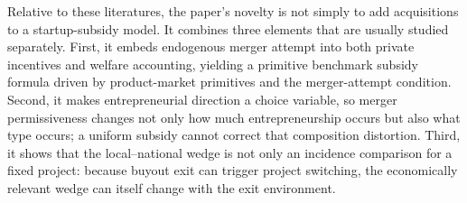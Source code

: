 Relative to these literatures, the paper's novelty is not simply to add acquisitions to a startup-subsidy model. It combines three elements that are usually studied separately. First, it embeds endogenous merger attempt into both private incentives and welfare accounting, yielding a primitive benchmark subsidy formula driven by product-market primitives and the merger-attempt condition. Second, it makes entrepreneurial direction a choice variable, so merger permissiveness changes not only how much entrepreneurship occurs but also what type occurs; a uniform subsidy cannot correct that composition distortion. Third, it shows that the local--national wedge is not only an incidence comparison for a fixed project: because buyout exit can trigger project switching, the economically relevant wedge can itself change with the exit environment.
